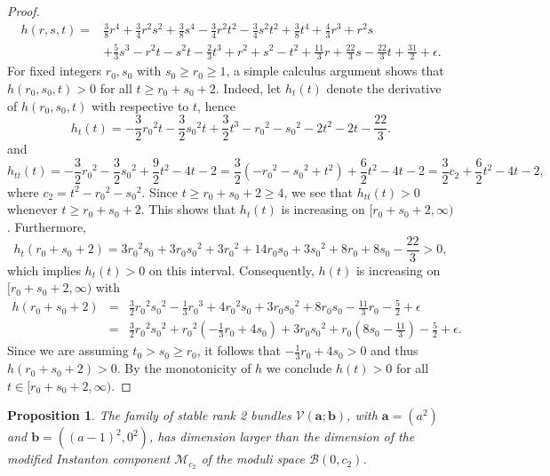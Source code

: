 \documentclass[twoside,reqno]{amsart}
\theoremstyle{plain}
\newtheorem{proposition}[theorem]{Proposition}
\begin{document}
\begin{proof}
 \begin{eqnarray*}
 h(r,s,t)=&\frac{3}{8}r^{4}+\frac{3}{4}r^{2}s^{2}+\frac{3}{8}s^{4}-\frac{3}{4}r^{2}t^{2}-\frac{3}{4}s^{2}t^{2}+\frac{3}{8}t^{4}
 +\frac{4}{3}r^{3}+r^{2}s\\
 &+\frac{5}{3}s^{3}-r^{2}t-s^{2}t-\frac{2}{3}t^{3}+r^{2}+s^{2}-t^{2}+\frac{11}{3}r+\frac{22}{3}s-\frac{22}{3}t+\frac{31}{2}+\epsilon.   
 \end{eqnarray*}
For fixed integers $r_0, s_0$ with $s_0\geq r_0\geq 1$, a simple calculus argument shows that $h(r_0,s_0,t)>0$ for all $t\geq r_0+s_0+2$. Indeed, let $h_t(t)$ denote the derivative of $h(r_0,s_0,t)$ with respective to $t$, hence
$$h_t(t)=-\frac{3}{2}{r_0}^{2}t-\frac{3}{2}{s_0}^{2}t+\frac{3}{2}t^{3}-{r_0}^{2}-{s_0}^{2}-2t^{2}-2t-\frac{22}{3}.$$
and 
 $$h_{tt}(t)=-\frac{3}{2}{r_0}^{2}-\frac{3}{2}{s_0}^{2}+\frac{9}{2}t^{2}-4t-2=\frac{3}{2}(-{r_0}^{2}-{s_0}^{2}+t^2)+\frac{6}{2}t^{2}-4t-2=\frac{3}{2}c_2+\frac{6}{2}t^{2}-4t-2,$$
where $c_2=t^2-{r_0}^{2}-{s_0}^{2}$. Since $t\geq r_0+s_0+2\geq 4$, we see that $h_{tt}(t)>0$ whenever $t\geq r_0+s_0+2$. This shows that  $h_t(t)$ is increasing on
$[r_0+s_0+2,\infty)$. Furthermore,
$$h_t(r_0+s_0+2)=3{r_0}^{2}s_0+3{r_0}{s_0}^{2}+3{r_0}^{2}+14r_0s_0+3{s_0}^{2}+8r_0+8s_0-\frac{22}{3}>0,$$ 
which implies $h_t(t)>0$ on this interval. Consequently, $h(t)$ is increasing on  $[r_0+s_0+2,\infty)$ with 
$$\begin{matrix}
    h(r_0+s_0+2)&=&\frac{3}{2}{r_0}^{2}{s_0}^{2}-\frac{1}{3}{r_0}^{3}+4{r_0}^{2}{s_0}+3{r_0}{s_0}^{2}+8{r_0}{s_0}-\frac{11}{3}r_0-\frac{5}{2}+\epsilon\\
    &=&\frac{3}{2}{r_0}^{2}{s_0}^{2}+{r_0}^2(-\frac{1}{3}{r_0}+4{s_0})+3{r_0}{s_0}^{2}+r_0(8{s_0}-\frac{11}{3})-\frac{5}{2}+\epsilon.
\end{matrix}$$
Since we are assuming $t_0>s_0\geq r_0$, it follows that $-\frac{1}{3}{r_0}+4{s_0}>0$ and thus $h(r_0+s_0+2)>0$. By the monotonicity of $h$ we conclude  $h(t)>0$ for all $t \in [r_0+s_0+2,\infty)$.
\end{proof}
%
\begin{proposition}\label{prop-dim2}
The family of stable rank 2 bundles $\mathcal{V}(\boldsymbol{a};\boldsymbol{b})$, with $\boldsymbol{a}=(a^2)$ and $\boldsymbol{b}=({(a-1)}^2,0^2)$, has dimension larger than the dimension of the modified Instanton component $\mathcal{M}_{c_2}$ of the moduli space $\mathcal{B}(0,c_2)$.
 \end{proposition}
\end{document}
